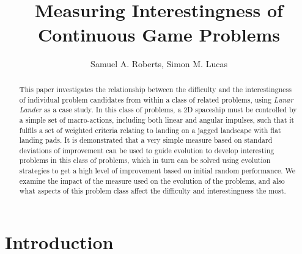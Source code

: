 \documentclass[conference]{IEEEtran}
\begin{document}
\title{\ \\ \LARGE\bf Measuring Interestingness of Continuous Game Problems }

\author{Samuel A. Roberts, Simon M. Lucas}


\maketitle

\begin{abstract}

This paper investigates the relationship between the difficulty and the interestingness of individual problem candidates from within a class of related problems, using {\itshape Lunar Lander} as a case study. In this class of problems, a 2D spaceship must be controlled by a simple set of macro-actions, including both linear and angular impulses, such that it fulfils a set of weighted criteria relating to landing on a jagged landscape with flat landing pads. 
It is demonstrated that a very simple measure based on standard deviations of improvement can be used to guide evolution to develop interesting problems in this class of problems, which in turn can be solved using evolution strategies to get a high level of improvement based on initial random performance. We examine the impact of the measure used on the evolution of the problems, and also what aspects of this problem class affect the difficulty and interestingness the most. 

\end{abstract}


\section{Introduction}
\end{document}
